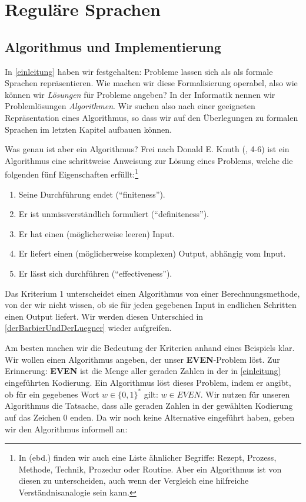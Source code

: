 \chapter{Reguläre Sprachen}

\section{Algorithmus und Implementierung}

In \autoref{einleitung} haben wir festgehalten:
Probleme lassen sich als als formale Sprachen repräsentieren.
Wie machen wir diese Formalisierung operabel,
also wie können wir \emph{Lösungen} für Probleme angeben?
In der Informatik nennen wir Problemlösungen \emph{Algorithmen}.
Wir suchen also nach einer geeigneten Repräsentation eines Algorithmus,
so dass wir auf den Überlegungen zu formalen Sprachen im letzten Kapitel aufbauen können.

Was genau ist aber ein Algorithmus?
Frei nach Donald E. Knuth (\cite{knuth1}, 4-6)
ist ein Algorithmus eine schrittweise Anweisung zur Lösung eines Problems,
welche die folgenden fünf Eigenschaften erfüllt:\footnote{
    In \cite{knuth1} (ebd.) finden wir auch eine Liste ähnlicher Begriffe:
    Rezept, Prozess, Methode, Technik, Prozedur oder Routine.
    Aber ein Algorithmus ist von diesen zu unterscheiden,
    auch wenn der Vergleich eine hilfreiche Verständnisanalogie sein kann.
}
\begin{enumerate}
    \item Seine Durchführung endet (``finiteness'').
    \item Er ist unmissverständlich formuliert (``definiteness'').
    \item Er hat einen (möglicherweise leeren) Input.
    \item Er liefert einen (möglicherweise komplexen) Output, abhängig vom Input.
    \item Er lässt sich durchführen (``effectiveness'').
\end{enumerate}

Das Kriterium 1 unterscheidet einen Algorithmus von einer Berechnungsmethode,
von der wir nicht wissen, ob sie für jeden gegebenen Input in endlichen Schritten einen
Output liefert.
Wir werden diesen Unterschied in \autoref{derBarbierUndDerLuegner} wieder aufgreifen.

Am besten machen wir die Bedeutung der Kriterien anhand eines Beispiels klar.
Wir wollen einen Algorithmus angeben, der unser \textbf{EVEN}-Problem löst.
Zur Erinnerung: \textbf{EVEN} ist die Menge aller geraden Zahlen
in der in \autoref{einleitung} eingeführten Kodierung.
Ein Algorithmus löst dieses Problem,
indem er angibt,
ob für ein gegebenes Wort $w \in \{0,1\}^*$ gilt: $w \in EVEN$.
Wir nutzen für unseren Algorithmus die Tatsache,
dass alle geraden Zahlen in der gewählten Kodierung auf das Zeichen 0 enden.
Da wir noch keine Alternative eingeführt haben,
geben wir den Algorithmus informell an:

